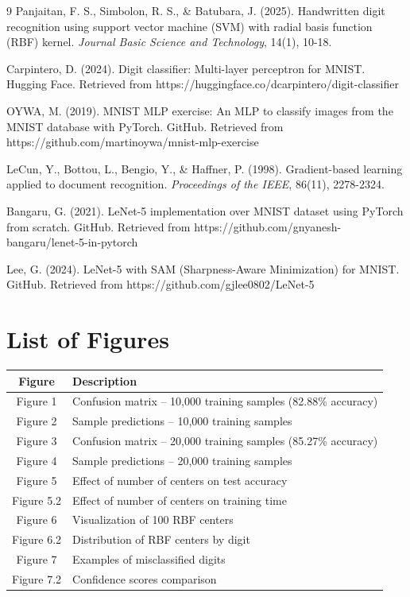 \documentclass[12pt]{article}
\begin{document}
\begin{thebibliography}{9}
		 Panjaitan, F. S., Simbolon, R. S., \& Batubara, J. (2025). Handwritten digit recognition using support vector machine (SVM) with radial basis function (RBF) kernel. \textit{Journal Basic Science and Technology}, 14(1), 10-18.
		
		 Carpintero, D. (2024). Digit classifier: Multi-layer perceptron for MNIST. Hugging Face. Retrieved from https://huggingface.co/dcarpintero/digit-classifier
		
		 OYWA, M. (2019). MNIST MLP exercise: An MLP to classify images from the MNIST database with PyTorch. GitHub. Retrieved from https://github.com/martinoywa/mnist-mlp-exercise
		
		 LeCun, Y., Bottou, L., Bengio, Y., \& Haffner, P. (1998). Gradient-based learning applied to document recognition. \textit{Proceedings of the IEEE}, 86(11), 2278-2324.
		
		 Bangaru, G. (2021). LeNet-5 implementation over MNIST dataset using PyTorch from scratch. GitHub. Retrieved from https://github.com/gnyanesh-bangaru/lenet-5-in-pytorch
		
		 Lee, G. (2024). LeNet-5 with SAM (Sharpness-Aware Minimization) for MNIST. GitHub. Retrieved from https://github.com/gjlee0802/LeNet-5
		
	\end{thebibliography}
	
	\newpage
	\section*{List of Figures}
	
	\begin{table}[H]
		\centering
		\begin{tabular}{cl}
			\toprule
			\textbf{Figure} & \textbf{Description} \\
			\midrule
			Figure 1 & Confusion matrix – 10,000 training samples (82.88\% accuracy) \\
			Figure 2 & Sample predictions – 10,000 training samples \\
			Figure 3 & Confusion matrix – 20,000 training samples (85.27\% accuracy) \\
			Figure 4 & Sample predictions – 20,000 training samples \\
			Figure 5 & Effect of number of centers on test accuracy \\
			Figure 5.2 & Effect of number of centers on training time \\
			Figure 6 & Visualization of 100 RBF centers \\
			Figure 6.2 & Distribution of RBF centers by digit \\
			Figure 7 & Examples of misclassified digits \\
			Figure 7.2 & Confidence scores comparison \\
			\bottomrule
		\end{tabular}
	\end{table}
	
\end{document}
